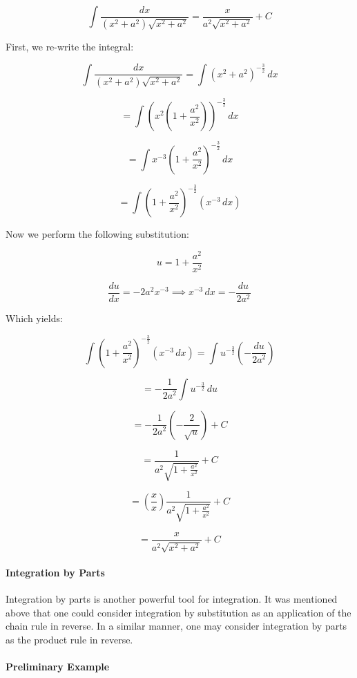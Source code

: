 $$\int \frac{dx}{(x^2 + a^2) \sqrt{x^2 + a^2}} = \frac{x}{a^2 \sqrt{x^2 + a^2}} + C$$



First, we re-write the integral:



$$\int \frac{dx}{(x^2 + a^2) \sqrt{x^2 + a^2}} = \int (x^2 + a^2)^{-\frac{3}{2}} \, dx$$  

$$= \int \left(x^2 \left(1 + \frac{a^2}{x^2}\right)\right)^{-\frac{3}{2}} \, dx$$  

$$= \int x^{-3} \left(1 + \frac{a^2}{x^2}\right)^{-\frac{3}{2}} \, dx$$  

$$= \int \left(1 + \frac{a^2}{x^2}\right)^{-\frac{3}{2}} \left(x^{-3} \, dx\right)$$



Now we perform the following substitution:  

$$u = 1 + \frac{a^2}{x^2}$$  

$$\frac{du}{dx} = -2a^2 x^{-3} \implies x^{-3} \, dx = -\frac{du}{2a^2}$$



Which yields:



$$\int \left(1 + \frac{a^2}{x^2}\right)^{-\frac{3}{2}} \left(x^{-3} \, dx\right) = \int u^{-\frac{3}{2}} \left(-\frac{du}{2a^2}\right)$$  

$$= -\frac{1}{2a^2} \int u^{-\frac{3}{2}} \, du$$  

$$= -\frac{1}{2a^2} \left(-\frac{2}{\sqrt{u}}\right) + C$$  

$$= \frac{1}{a^2 \sqrt{1 + \frac{a^2}{x^2}}} + C$$  

$$= \left(\frac{x}{x}\right) \frac{1}{a^2 \sqrt{1 + \frac{a^2}{x^2}}} + C$$  

$$= \frac{x}{a^2 \sqrt{x^2 + a^2}} + C$$



\paragraph{Integration by Parts}



Integration by parts is another powerful tool for integration. It was mentioned above that one could consider integration by substitution as an application of the chain rule in reverse. In a similar manner, one may consider integration by parts as the product rule in reverse.



\paragraph{Preliminary Example}



